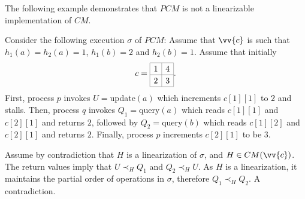 The following example demonstrates that $PCM$ is not a linearizable implementation of $CM$.

\begin{example}
    Consider the following execution $\sigma$ of $PCM$: Assume that $\vv{c}$ is such that $h_1(a)=h_2(a)=1$, $h_1(b)=2$ and $h_2(b)=1$.
    Assume that initially
    \[ c=\CM{1}{4}{2}{3}. \]
    First, process $p$ invokes $U=${\sc update}$(a)$ which increments $c[1][1]$ to $2$ and stalls.
    Then, process $q$ invokes $Q_1=${\sc query}$(a)$ which reads $c[1][1]$ and $c[2][1]$ and returns $2$,
    followed by $Q_2=${\sc query}$(b)$ which reads $c[1][2]$ and $c[2][1]$ and returns $2$. Finally, process $p$ increments $c[2][1]$ to be $3$.

    Assume by contradiction that $H$ is a linearization of $\sigma$, and $H \in CM(\vv{c})$.
    The return values imply that $U \prec_H Q_1$ and $Q_2 \prec_H U$. As $H$ is a linearization, it maintains
    the partial order of operations in $\sigma$, therefore $Q_1 \prec_H Q_2$. A contradiction.
\end{example}




